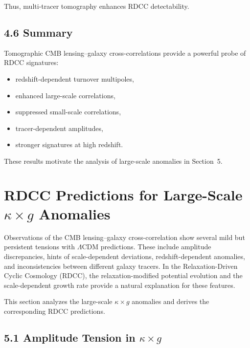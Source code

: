 \documentclass[11pt,a4paper]{article}
\begin{document}
Thus, multi-tracer tomography enhances RDCC detectability.

\subsection*{4.6 Summary}

Tomographic CMB lensing–galaxy cross-correlations provide a powerful probe of RDCC 
signatures:

\begin{itemize}
    \item redshift-dependent turnover multipoles,
    \item enhanced large-scale correlations,
    \item suppressed small-scale correlations,
    \item tracer-dependent amplitudes,
    \item stronger signatures at high redshift.
\end{itemize}

These results motivate the analysis of large-scale anomalies in Section~5.

\section{RDCC Predictions for Large-Scale \texorpdfstring{$\kappa \times g$}{κ × g} Anomalies}

Observations of the CMB lensing–galaxy cross-correlation show several mild but persistent 
tensions with $\Lambda$CDM predictions. These include amplitude discrepancies, hints of 
scale-dependent deviations, redshift-dependent anomalies, and inconsistencies between 
different galaxy tracers. In the Relaxation-Driven Cyclic Cosmology (RDCC), the 
relaxation-modified potential evolution and the scale-dependent growth rate provide a 
natural explanation for these features.

This section analyzes the large-scale $\kappa \times g$ anomalies and derives the 
corresponding RDCC predictions.

\subsection*{5.1 Amplitude Tension in $\kappa \times g$}
\end{document}
